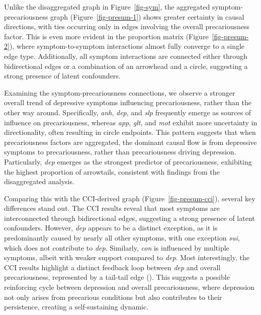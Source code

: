 \documentclass[
]{article}
\begin{document}
Unlike the disaggregated graph in Figure~\ref{fig-sym}, the aggregated
symptom-precariousness graph (Figure~\ref{fig-presum-1}) shows greater
certainty in causal directions, with ties occurring only in edges
involving the overall precariousness factor. This is even more evident
in the proportion matrix (Figure~\ref{fig-presum-2}), where
symptom-to-symptom interactions almost fully converge to a single edge
type. Additionally, all symptom interactions are connected either
through bidirectional edges or a combination of an arrowhead and a
circle, suggesting a strong presence of latent confounders.

Examining the symptom-precariousness connections, we observe a stronger
overall trend of depressive symptoms influencing precariousness, rather
than the other way around. Specifically, \emph{anh}, \emph{dep}, and
\emph{slp} frequently emerge as sources of influence on precariousness,
whereas \emph{app}, \emph{glt}, and \emph{mot} exhibit more uncertainty
in directionality, often resulting in circle endpoints. This pattern
suggests that when precariousness factors are aggregated, the dominant
causal flow is from depressive symptoms to precariousness, rather than
precariousness driving depression. Particularly, \emph{dep} emerges as
the strongest predictor of precariousness, exhibiting the highest
proportion of arrowtails, consistent with findings from the
disaggregated analysis.

Comparing this with the CCI-derived graph (Figure~\ref{fig-presum-cci}),
several key differences stand out. The CCI results reveal that most
symptoms are interconnected through bidirectional edges, suggesting a
strong presence of latent confounders. However, \emph{dep} appears to be
a distinct exception, as it is predominantly caused by nearly all other
symptoms, with one exception \emph{sui}, which does not contribute to
\emph{dep}. Similarly, \emph{con} is influenced by multiple symptoms,
albeit with weaker support compared to \emph{dep}. Most interestingly,
the CCI results highlight a distinct feedback loop between \emph{dep}
and overall precariousness, represented by a tail-tail edge
(\textemdash ). This suggests a possible reinforcing cycle between
depression and overall precariousness, where depression not only arises
from precarious conditions but also contributes to their persistence,
creating a self-sustaining dynamic.
\end{document}
